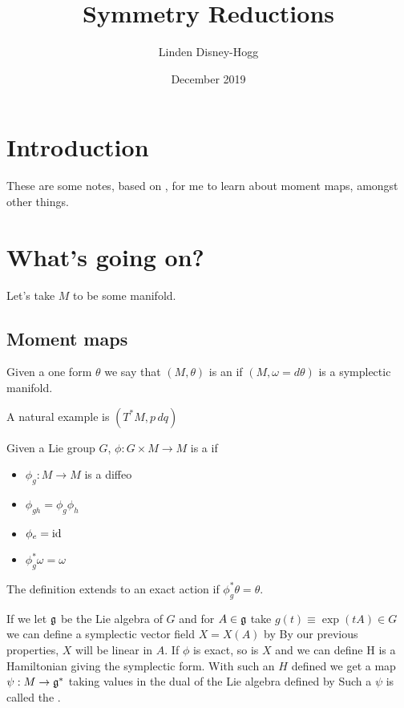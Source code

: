 \documentclass{article}
\title{Symmetry Reductions}
\author{Linden Disney-Hogg}
\date{December 2019}
\begin{document}
\maketitle
\tableofcontents

\section{Introduction}
These are some notes, based on \cite{Moser2010VariousSystems}, for me to learn about moment maps, amongst other things. 
\section{What's going on?}
Let's take $M$ to be some manifold. 
\subsection{Moment maps}
\begin{definition}
Given a one form $\theta$ we say that $(M,\theta)$ is an  if $(M,\omega = d\theta)$ is a symplectic manifold. 
\end{definition}

\begin{example}
A natural example is $(T^\ast M, p\, dq)$
\end{example}

\begin{definition}
Given a Lie group $G$, $\phi:G\times M \to M$ is a  if 
\begin{itemize}
    \item $\phi_g : M \to M$ is a diffeo
    \item $\phi_{gh} = \phi_g \phi_h$
    \item $\phi_e = \operatorname{id}$
    \item $\phi_g^\ast \omega = \omega$
\end{itemize}
The definition extends to an exact action if $\phi_g^\ast \theta = \theta$. 
\end{definition}

If we let $\mathfrak{g}$ be the Lie algebra of $G$ and for $A \in \mathfrak{g}$ take $g(t) \equiv \exp(tA) \in G$ we can define a symplectic vector field $X=X(A)$ by 
By our previous properties, $X$ will be linear in $A$. If $\phi$ is exact, so is $X$ and we can define 
H is a Hamiltonian giving the symplectic form. With such an $H$ defined we get a map $\psi:M \to \mathfrak{g}^\ast$ taking values in the dual of the Lie algebra defined by 
Such a $\psi$ is called the . 
\end{document}
